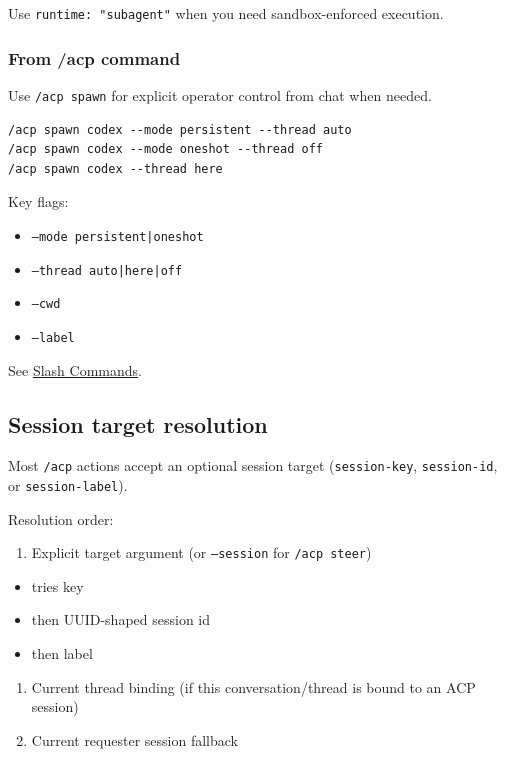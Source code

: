 Use \texttt{runtime: "subagent"} when you need sandbox-enforced execution.

\subsubsection{From /acp command}


Use \texttt{/acp spawn} for explicit operator control from chat when needed.

\begin{lstlisting}
/acp spawn codex --mode persistent --thread auto
/acp spawn codex --mode oneshot --thread off
/acp spawn codex --thread here
\end{lstlisting}


Key flags:

\begin{itemize}
  \item \texttt{--mode persistent|oneshot}
  \item \texttt{--thread auto|here|off}
  \item \texttt{--cwd }
  \item \texttt{--label }
\end{itemize}


See \href{/tools/slash-commands}{Slash Commands}.

\subsection{Session target resolution}


Most \texttt{/acp} actions accept an optional session target (\texttt{session-key}, \texttt{session-id}, or \texttt{session-label}).

Resolution order:

\begin{enumerate}
  \item Explicit target argument (or \texttt{--session} for \texttt{/acp steer})
\end{enumerate}

\begin{itemize}
  \item tries key
  \item then UUID-shaped session id
  \item then label
\end{itemize}

\begin{enumerate}
  \item Current thread binding (if this conversation/thread is bound to an ACP session)
  \item Current requester session fallback
\end{enumerate}


